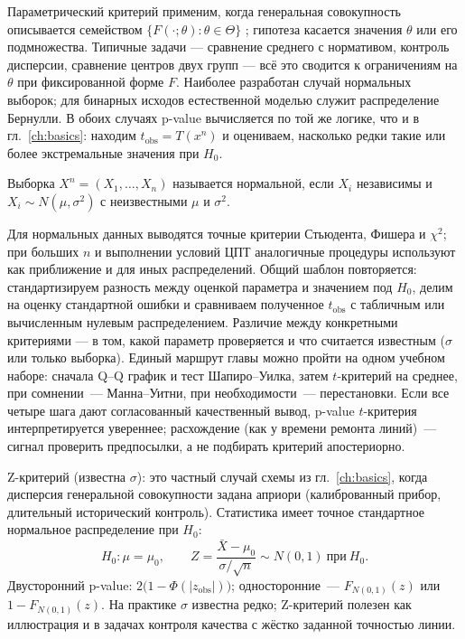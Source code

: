 Параметрический критерий применим, когда генеральная совокупность описывается семейством $\{F(\cdot;\theta):\theta\in\Theta\}$ \citep{lehmann2005}; гипотеза касается значения $\theta$ или его подмножества.
Типичные задачи --- сравнение среднего с нормативом, контроль дисперсии, сравнение центров двух групп --- всё это сводится к ограничениям на $\theta$ при фиксированной форме $F$.
Наиболее разработан случай нормальных выборок; для бинарных исходов естественной моделью служит распределение Бернулли.
В обоих случаях p-value вычисляется по той же логике, что и в гл.~\ref{ch:basics}: находим $t_{\text{obs}}=T(x^n)$ и оцениваем, насколько редки такие или более экстремальные значения при $H_0$.

\begin{definition}
Выборка $X^n=(X_1,\ldots,X_n)$ называется нормальной, если $X_i$ независимы и $X_i\sim N(\mu,\sigma^2)$ с неизвестными $\mu$ и $\sigma^2$.
\end{definition}

Для нормальных данных выводятся точные критерии Стьюдента, Фишера и $\chi^2$; при больших $n$ и выполнении условий ЦПТ аналогичные процедуры используют как приближение и для иных распределений.
Общий шаблон повторяется: стандартизируем разность между оценкой параметра и значением под $H_0$, делим на оценку стандартной ошибки и сравниваем полученное $t_{\text{obs}}$ с табличным или вычисленным нулевым распределением.
Различие между конкретными критериями --- в том, какой параметр проверяется и что считается известным ($\sigma$ или только выборка).
Единый маршрут главы можно пройти на одном учебном наборе: сначала Q--Q график и тест Шапиро--Уилка, затем $t$-критерий на среднее, при сомнении~--- Манна--Уитни, при необходимости~--- перестановки.
Если все четыре шага дают согласованный качественный вывод, p-value $t$-критерия интерпретируется увереннее; расхождение (как у времени ремонта линий)~--- сигнал проверить предпосылки, а не подбирать критерий апостериорно.

Z-критерий (известна $\sigma$): это частный случай схемы из гл.~\ref{ch:basics}, когда дисперсия генеральной совокупности задана априори (калиброванный прибор, длительный исторический контроль). Статистика имеет точное стандартное нормальное распределение при $H_0$: \[ H_0\colon \mu=\mu_0,\qquad Z=\frac{\bar X-\mu_0}{\sigma/\sqrt n}\sim N(0,1)\ \text{при}\ H_0.
\] Двусторонний p-value: $2\bigl(1-\Phi(|z_{\text{obs}}|)\bigr)$; односторонние~--- $F_{N(0,1)}(z)$ или $1-F_{N(0,1)}(z)$.
На практике $\sigma$ известна редко; Z-критерий полезен как иллюстрация и в задачах контроля качества с жёстко заданной точностью линии.

